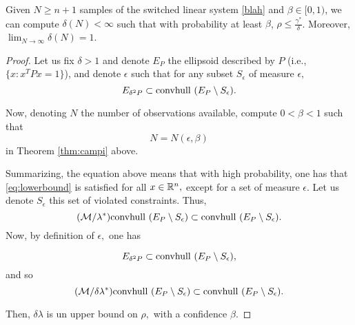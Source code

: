 \begin{theorem} \label{thm:mainTheorem} Given $N \geq n+1$ samples of the switched linear system \eqref{blah} and $\beta \in [0,1)$, we can compute $\delta(N) < \infty$ such that with probability at least $\beta$, $\rho \leq \frac{\gamma^*}{\delta}$. Moreover, $\lim_{N \to \infty} \delta(N) = 1$.
\end{theorem}

\begin{proof}
Let us fix $\delta>1$ and denote $E_P$ the ellipsoid described by $P$ (i.e., $\{x:x^TPx= 1\}$), and denote $\epsilon$ such that for any subset $S_\epsilon$ of measure $\epsilon,$ 
$$ E_{\delta^2P} \subset  \mbox{convhull } (E_P\setminus S_\epsilon) .$$ 
  	
Now, denoting $N$ the number of observations available, compute $0< \beta< 1$ such that $$N=N(\epsilon,\beta)$$ in Theorem \ref{thm:campi} above. 

Summarizing, the equation above means that with high probability, one has that \eqref{eq:lowerbound} is satisfied for all $x\in \mathbb{R}^n,$ except for a set of measure $\epsilon.$  Let us denote $S_\epsilon$ this set of violated constraints.  Thus, $$(\mathcal{M}/\lambda^*) \mbox{convhull } (E_P\setminus S_\epsilon) \subset \mbox{convhull } (E_P\setminus S_\epsilon).$$  Now, by definition of $\epsilon,$ one has

$$ E_{\delta^2P} \subset  \mbox{convhull } (E_P\setminus S_\epsilon) ,$$ and so
$$
(\mathcal{M}/\delta \lambda^*) \mbox{convhull } (E_P \setminus S_\epsilon) \subset \mbox{convhull } (E_P\setminus S_\epsilon).$$

Then, $\delta\lambda$ is un upper bound on $\rho,$ with a confidence $\beta.$ 
\end{proof}